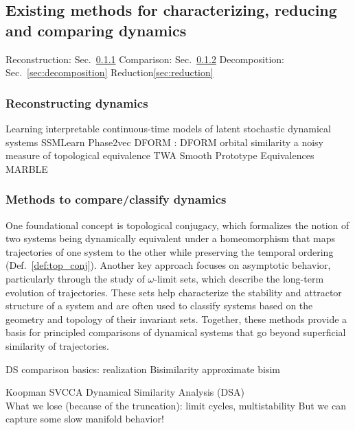 \documentclass{article}
\theoremstyle{definition} \newtheorem{definition}{Definition}  \newtheorem{example}{Example}
\theoremstyle{remark} \newtheorem{remark}{Remark}
\newcounter{ct}
\begin{document}
\subsection{Existing methods for characterizing, reducing and comparing dynamics}\label{sec:sota_methods}

Reconstruction: Sec.~\ref{sec:reconstruction}
Comparison: Sec.~\ref{sec:comparison}
Decomposition: Sec.~\ref{sec:decomposition}
Reduction\ref{sec:reduction}


\subsubsection{Reconstructing dynamics}\label{sec:reconstruction}
Learning interpretable continuous-time models of latent stochastic dynamical systems \citep{duncker2019learning}
%
SSMLearn \citep{cenedese2022data}
%
Phase2vec \citep{ricci2022phase2vec}
DFORM \citep{chen2024dform}: DFORM orbital similarity a noisy measure of topological equivalence
TWA \citep{moriel2024timewarpattend}
Smooth Prototype Equivalences \citep{friedman2025characterizing}
%
MARBLE \citep{gosztolai2025marble}


\subsubsection{Methods to compare/classify dynamics}\label{sec:comparison}
One foundational concept is topological conjugacy, which formalizes the notion of two systems being dynamically equivalent under a homeomorphism that maps trajectories of one system to the other while preserving the temporal ordering (Def.~\ref{def:top_conj}).
Another key approach focuses on asymptotic behavior, particularly through the study of $\omega$-limit sets, which describe the long-term evolution of trajectories.
These sets help characterize the stability and attractor structure of a system and are often used to classify systems based on the geometry and topology of their invariant sets.
Together, these methods provide a basis for principled comparisons of dynamical systems that go beyond superficial similarity of trajectories.

DS comparison basics: 
realization \citep{grigoryeva2020dimension} \citep{gonon2023approximation}
Bisimilarity\citep{vanderschaft2004bisimulation, vanderschaft2004equivalence, pola2004bisimulation, pola2006equivalence, tabuada2004bisimilar}
approximate bisim\citep{girard2011approximate}

Koopman \citep{mezic2004comparison}
SVCCA\citep{raghu2017svcca}
Dynamical Similarity Analysis (DSA) \citep{ostrow2024beyond} \citep{kamiya2024koopman}\\
What we lose (because of the truncation): limit cycles, multistability
But we can capture some slow manifold behavior!
\end{document}
